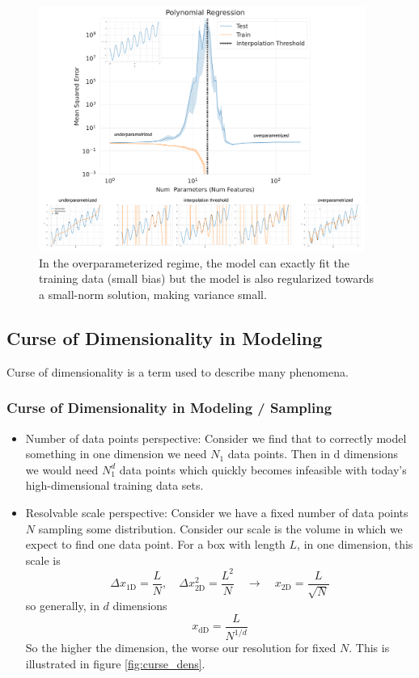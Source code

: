 \begin{figure}[!htb]
    \centering
    \includegraphics[width=0.95\textwidth]{figures/ddpr.pdf}
    \caption{In the overparameterized regime, the model can exactly fit the training data (small bias)
    but the model is also regularized towards a small-norm solution, making variance small.}
    \label{fig:double_descent_pol}
\end{figure}

\subsection{Curse of Dimensionality in Modeling\skipthis}
Curse of dimensionality is a term used to describe many phenomena.

\subsubsection{Curse of Dimensionality in Modeling / Sampling}
\begin{itemize}
    \item \textcolor{blue1}{Number of data points perspective}: Consider we find that to correctly model something in one dimension we need $N_1$ data points. Then in d dimensions we would need $N_1^d$ data points which quickly becomes infeasible with today's high-dimensional training data sets.
    \item \textcolor{blue1}{Resolvable scale perspective}: Consider we have a fixed number of data points $N$ sampling some distribution. Consider 
    our scale is the volume in which we expect to find one data point. For a box with length $L$, in one dimension, this scale is
    \begin{equation}
        \Delta x_{\text{1D}} = \frac{L}{N}, \quad \Delta x_{\text{2D}}^2 = \frac{L^2}{N} \quad \rightarrow \quad x_{\text{2D}} = \frac{L}{\sqrt{N}}
    \end{equation}
    so generally, in $d$ dimensions
    \begin{equation}
        x_{\text{dD}} = \frac{L}{N^{1/d}}
    \end{equation}
    So the higher the dimension, the worse our resolution for fixed $N$. This is illustrated in figure \ref{fig:curse_dens}.
\end{itemize}

